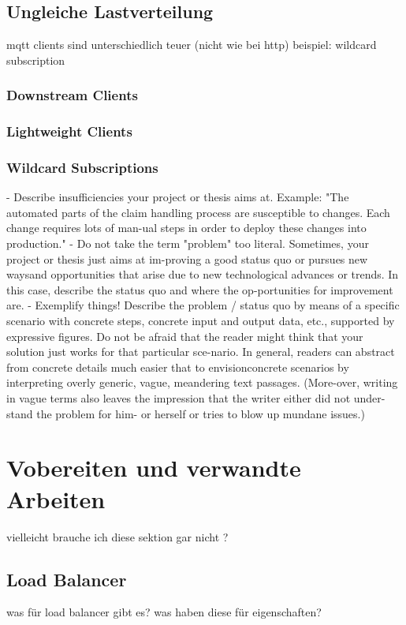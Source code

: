 \subsection{Ungleiche Lastverteilung}
mqtt clients sind unterschiedlich teuer (nicht wie bei http)
beispiel: wildcard subscription

\subsubsection{Downstream Clients}
\subsubsection{Lightweight Clients}
\subsubsection{Wildcard Subscriptions}

- Describe insufficiencies your project or thesis aims at. Example: "The automated parts of the claim handling process are susceptible to changes. Each change requires lots of man-ual steps in order to deploy these changes into production."
- Do not take the term "problem" too literal. Sometimes, your project or thesis just aims at im-proving a good status quo or pursues new waysand opportunities that arise due to new technological advances or trends. In this case, describe the status quo and where the op-portunities for improvement are.
- Exemplify things! Describe the problem / status quo by means of a specific scenario with concrete steps, concrete input and output data, etc., supported by expressive figures. Do not be afraid that the reader might think that your solution just works for that particular sce-nario. In general, readers can abstract from concrete details much easier that to envisionconcrete scenarios by interpreting overly generic, vague, meandering text passages. (More-over, writing in vague terms also leaves the impression that the writer either did not under-stand the problem for him- or herself or tries to blow up mundane issues.)

\section{Vobereiten und verwandte Arbeiten}
vielleicht brauche ich diese sektion gar nicht ?

\subsection{Load Balancer}
was für load balancer gibt es? was haben diese für eigenschaften?

